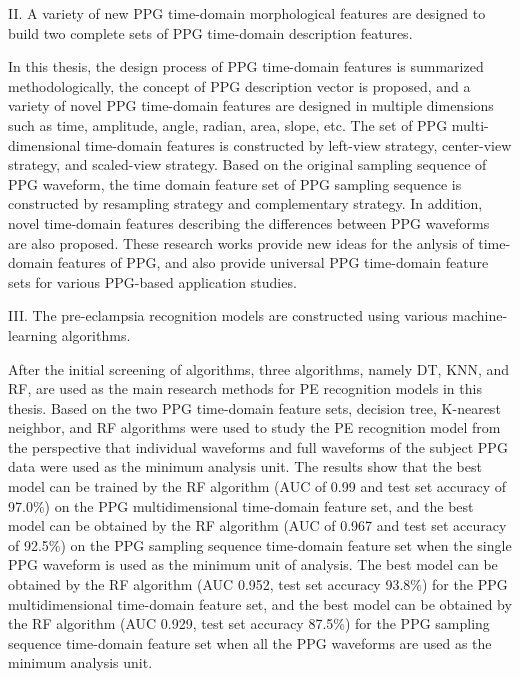 II. A variety of new PPG time-domain morphological features are designed to build two complete sets of PPG time-domain description features.

In this thesis, the design process of PPG time-domain features is summarized methodologically, the concept of PPG description vector is proposed, 
and a variety of novel PPG time-domain features are designed in multiple dimensions such as time, amplitude, angle, radian, area, slope, etc. 
The set of PPG multi-dimensional time-domain features is constructed by left-view strategy, center-view strategy, and scaled-view strategy. 
Based on the original sampling sequence of PPG waveform, the time domain feature set of PPG sampling sequence is constructed by resampling strategy and 
complementary strategy. In addition, novel time-domain features describing the differences between PPG waveforms are also proposed. 
These research works provide new ideas for the anlysis of time-domain features of PPG, and also provide universal PPG time-domain feature sets for various PPG-based application studies.

III. The pre-eclampsia recognition models are constructed using various machine-learning algorithms.

After the initial screening of algorithms, three algorithms, namely DT, KNN, and RF, are used as the main research methods 
for PE recognition models in this thesis. Based on the two PPG time-domain feature sets, decision tree, K-nearest neighbor, and RF algorithms were 
used to study the PE recognition model from the perspective that individual waveforms and full waveforms of the subject PPG data were used as the minimum analysis unit. 
The results show that the best model can be trained by the RF algorithm (AUC of 0.99 and test set accuracy of 97.0\%) on the PPG multidimensional time-domain 
feature set, and the best model can be obtained by the RF algorithm (AUC of 0.967 and test set accuracy of 92.5\%) on the PPG sampling sequence time-domain 
feature set when the single PPG waveform is used as the minimum unit of analysis. The best model can be obtained by the RF algorithm (AUC 0.952, 
test set accuracy 93.8\%) for the PPG multidimensional time-domain feature set, and the best model can be obtained by the RF algorithm (AUC 0.929, 
test set accuracy 87.5\%) for the PPG sampling sequence time-domain feature set when all the PPG waveforms are used as the minimum analysis unit.

